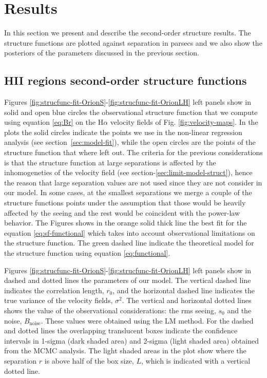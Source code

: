 \documentclass[fleqn,usenatbib, useAMS, a4paper]{mnras}
\newcommand\ha{\ensuremath{\text{H}\alpha}}
\begin{document}
\section{Results}\label{sec:results}

In this section we present and describe the second-order structure results. The structure functions are plotted against separation in parsecs and we also show the posteriors of the parameters discussed in the previous section.

\subsection{HII regions second-order structure functions}

Figures \ref{fig:strucfunc-fit-OrionS}-\ref{fig:strucfunc-fit-OrionLH} left panels show in solid and open blue circles the observational structure function that we compute using equation \ref{eq:Br} on the \ha{} velocity fields of Fig. \ref{fig:velocity-maps}. 
In the plots the solid circles indicate the points we use in the non-linear regression analysis (see section~\ref{sec:model-fit}), while the open circles are the points of the structure function that where left out.
The criteria for the previous considerations is that the structure function at large separations is affected by the inhomogeneties of the velocity field (see section-\ref{sec:limit-model-struct}), hence the reason that large separation values are not used since they are not consider in our model. 
In some cases, at the smallest separations we merge a couple of the structure functions points under the assumption that those would be heavily affected by the seeing and the rest would be coincident with the power-law behavior.
The Figures shows in the orange solid thick line the best fit for the equation \ref{eq:sf-functional} which takes into account observational limitations on the structure function.
The green dashed line indicate the theoretical model for the structure function using equation \ref{eq:functional}.

Figures \ref{fig:strucfunc-fit-OrionS}-\ref{fig:strucfunc-fit-OrionLH} left panels show in dashed and dotted lines the parameters of our model.
The vertical dashed line indicates the correlation length, \(r_0\), and the horizontal dashed line indicates the true variance of the velocity fields, \(\sigma^2\).
The vertical and horizontal dotted lines shows the value of the observational considerations: the rms seeing, \(s_0\) and the noise, \(B_{\text{noise}}\).
These values were obtained using the LM method.
For the dashed and dotted lines the overlapping translucent boxes indicate the confidence intervals in 1-sigma (dark shaded area) and 2-sigma (light shaded area) obtained from the MCMC analysis.
The light shaded areas in the plot show where the separation \(r\) is above half of the box size, \(L\), which is indicated with a vertical dotted line.
\end{document}
